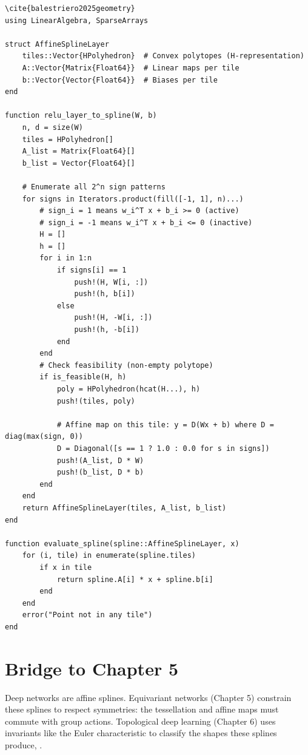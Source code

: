 \begin{lstlisting}[style=julia,caption=Exact affine spline representation of a ReLU layer] \cite{balestriero2025geometry}
using LinearAlgebra, SparseArrays

struct AffineSplineLayer
    tiles::Vector{HPolyhedron}  # Convex polytopes (H-representation)
    A::Vector{Matrix{Float64}}  # Linear maps per tile
    b::Vector{Vector{Float64}}  # Biases per tile
end

function relu_layer_to_spline(W, b)
    n, d = size(W)
    tiles = HPolyhedron[]
    A_list = Matrix{Float64}[]
    b_list = Vector{Float64}[]
    
    # Enumerate all 2^n sign patterns
    for signs in Iterators.product(fill([-1, 1], n)...)
        # sign_i = 1 means w_i^T x + b_i >= 0 (active)
        # sign_i = -1 means w_i^T x + b_i <= 0 (inactive)
        H = []
        h = []
        for i in 1:n
            if signs[i] == 1
                push!(H, W[i, :])
                push!(h, b[i])
            else
                push!(H, -W[i, :])
                push!(h, -b[i])
            end
        end
        # Check feasibility (non-empty polytope)
        if is_feasible(H, h)
            poly = HPolyhedron(hcat(H...), h)
            push!(tiles, poly)
            
            # Affine map on this tile: y = D(Wx + b) where D = diag(max(sign, 0))
            D = Diagonal([s == 1 ? 1.0 : 0.0 for s in signs])
            push!(A_list, D * W)
            push!(b_list, D * b)
        end
    end
    return AffineSplineLayer(tiles, A_list, b_list)
end

function evaluate_spline(spline::AffineSplineLayer, x)
    for (i, tile) in enumerate(spline.tiles)
        if x in tile
            return spline.A[i] * x + spline.b[i]
        end
    end
    error("Point not in any tile")
end
\end{lstlisting}

\section{Bridge to Chapter 5}
\label{sec:dl:bridge}

Deep networks are affine splines. Equivariant networks (Chapter 5) constrain these splines to respect symmetries: the tessellation and affine maps must commute with group actions. Topological deep learning (Chapter 6) uses invariants like the Euler characteristic to classify the shapes these splines produce, \cite{balestriero2025geometry}.

